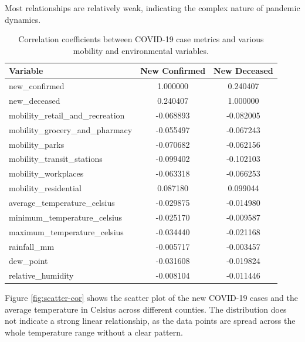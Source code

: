 \documentclass[sigconf,screen,nonacm]{acmart}
\begin{document}
Most relationships are relatively weak, indicating the complex nature of pandemic dynamics.




\begin{table}[H]
\centering
\caption{Correlation coefficients between COVID-19 case metrics and various mobility and environmental variables.}
\begin{tabular}{lcc}
\hline
\textbf{Variable} & \textbf{New Confirmed} & \textbf{New Deceased} \\ \hline
new\_confirmed & 1.000000 & 0.240407 \\
new\_deceased & 0.240407 & 1.000000 \\
mobility\_retail\_and\_recreation & -0.068893 & -0.082005 \\
mobility\_grocery\_and\_pharmacy & -0.055497 & -0.067243 \\
mobility\_parks & -0.070682 & -0.062156 \\
mobility\_transit\_stations & -0.099402 & -0.102103 \\
mobility\_workplaces & -0.063318 & -0.066253 \\
mobility\_residential & 0.087180 & 0.099044 \\
average\_temperature\_celsius & -0.029875 & -0.014980 \\
minimum\_temperature\_celsius & -0.025170 & -0.009587 \\
maximum\_temperature\_celsius & -0.034440 & -0.021168 \\
rainfall\_mm & -0.005717 & -0.003457 \\
dew\_point & -0.031608 & -0.019824 \\
relative\_humidity & -0.008104 & -0.011446 \\ \hline
\end{tabular}
\label{tab:correlation}
\end{table}




Figure \ref{fig:scatter-cor} shows the scatter plot of the new COVID-19 cases and the average temperature in Celsius across different counties. The distribution does not indicate a strong linear relationship, as the data points are spread across the whole temperature range without a clear pattern. 
\end{document}
